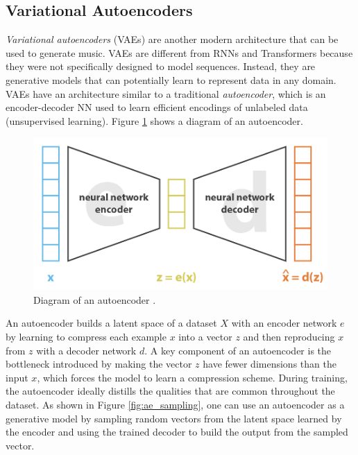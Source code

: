 
\subsection{Variational Autoencoders}

\textit{Variational autoencoders} (VAEs) \cite{kingma2013auto} are another modern architecture that can be used to generate music. VAEs are different from RNNs and Transformers because they were not specifically designed to model sequences. Instead, they are generative models that can potentially learn to represent data in any domain. VAEs have an architecture similar to a traditional \textit{autoencoder}, which is an encoder-decoder NN used to learn efficient encodings of unlabeled data (unsupervised learning). Figure \ref{fig:ae} shows a diagram of an autoencoder.

\begin{figure}[!h]
 \centering
 \includegraphics[width=0.7\columnwidth]{imgs/background/autoencoder.png}
 \caption{Diagram of an autoencoder \cite{rocca2019understanding}.}
 \label{fig:ae}
\end{figure}

An autoencoder builds a latent space of a dataset $X$ with an encoder network $e$ by learning to compress each example $x$ into a vector $z$ and then reproducing $x$ from $z$ with a decoder network $d$. A key component of an autoencoder is the bottleneck introduced by making the vector $z$ have fewer dimensions than the input $x$, which forces the model to learn a compression scheme. During training, the autoencoder ideally distills the qualities that are common throughout the dataset. As shown in Figure \ref{fig:ae_sampling}, one can use an autoencoder as a generative model by sampling random vectors from the latent space learned by the encoder and using the trained decoder to build the output from the sampled vector.


